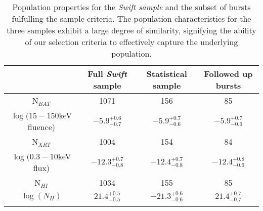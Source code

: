 \begin{table*}[!ht]

	\centering
	\begin{tabular}{cccc}
		\hline
		\hline\noalign{\smallskip}
		{} & {Full \textit{Swift} sample} & {Statistical sample} &  {Followed up bursts} \\
		\hline\noalign{\smallskip}
		N$_{BAT}$ & 1071 & 156 & 85\\
		$\log(15-150$keV fluence)  & $-5.9_{-0.7}^{+0.6}$ &  $-5.9_{-0.6}^{+0.7}$ &  $-5.9_{-0.6}^{+0.7}$   \\
		N$_{XRT}$ & 1004 & 154 & 84\\
		$\log(0.3-10$keV flux) & $-12.3_{-0.8}^{+0.7}$ &  $-12.4_{-0.8}^{+0.7}$ &  $-12.4_{-0.6}^{+0.8}$  \\
		N$_{HI}$ & 1034 & 155 & 85\\
		$\log(N_H)$ & $21.4_{-0.5}^{+0.5}$ &  $-21.3_{-0.6}^{+0.6}$ &  $21.4_{-0.7}^{+0.7}$  \\
		
		\hline\noalign{\smallskip}
		
	\end{tabular}
	\caption{Population properties for the \textit{Swift sample} and the subset of bursts fulfulling the sample criteria. The population characteristics for the three samples exhibit a large degree of similarity, signifying the ability of our selection criteria to effectively capture the underlying population.  \label{tab:sample_properties}}
\end{table*}